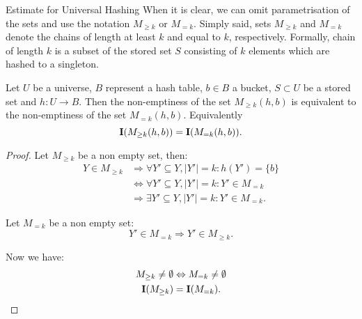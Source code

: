 \begin{section}{Estimate for Universal Hashing}
When it is clear, we can omit parametrisation of the sets and use the notation $M_{\geq k}$ or $M_{= k}$. Simply said, sets $M_{\geq k}$ and $M_{= k}$ denote the chains of length at least $k$ and equal to $k$, respectively. Formally, chain of length $k$ is a subset of the stored set $S$ consisting of $k$ elements which are hashed to a singleton.

\begin{lemma}
\label{lemma-indicator-k-collision}
Let $U$ be a universe, $B$ represent a hash table, $b \in B$ a bucket, $S \subset U$ be a stored set and $h: U \rightarrow B$. Then the non-emptiness of the set $M_{\geq k}(h, b)$ is equivalent to the non-emptiness of the set $M_{= k}(h, b)$. Equivalently
\begin{displaymath}
\mathbf{I}(M_{\geq k}(h, b)) = \mathbf{I}(M_{= k}(h, b)) \text{.}
\end{displaymath}
\begin{proof}
Let $M_{\geq k}$ be a non empty set, then:
\begin{displaymath}
\begin{split}
Y \in M_{\geq k} 
	& \Rightarrow \forall Y' \subseteq Y, |Y'| = k: h(Y') = \{b\} \\
	& \Leftrightarrow \forall Y' \subseteq Y, |Y'| = k: Y' \in M_{=k} \\
	& \Rightarrow \exists Y' \subseteq Y, |Y'| = k: Y' \in M_{=k} \text{.}
\end{split}
\end{displaymath}

Let $M_{=k}$ be a non empty set:
\begin{displaymath}
Y' \in M_{=k} \Rightarrow Y' \in M_{\geq k} \text{.}
\end{displaymath}

Now we have:
\begin{displaymath}
\begin{split}
M_{\geq k} \neq \emptyset & \Leftrightarrow  M_{= k} \neq \emptyset \\
\mathbf{I}(M_{\geq k}) & = \mathbf{I}(M_{= k}) \text{.}
\end{split}
\end{displaymath}
\end{proof}
\end{lemma}


\end{section}

